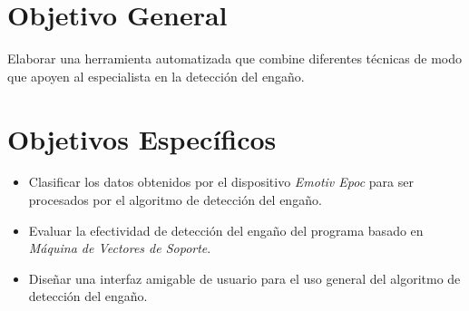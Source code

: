 \section{Objetivo General}
Elaborar una herramienta automatizada que combine diferentes técnicas de modo que apoyen al especialista en la detección del engaño.

\section{Objetivos Específicos}
\begin{itemize}
\item Clasificar los datos obtenidos por el dispositivo \textit{Emotiv Epoc} para ser procesados por el algoritmo de detección del engaño. 
\item Evaluar la efectividad de detección del engaño del programa basado en \textit{Máquina de Vectores de Soporte}.
\item Diseñar una interfaz amigable de usuario para el uso general del algoritmo de detección del engaño. 
\end{itemize}